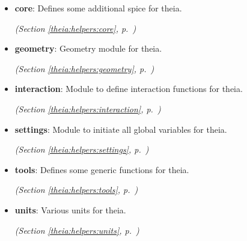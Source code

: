 \begin{itemize}
\setlength{\parskip}{0ex}
\item \textbf{core}: Defines some additional spice for theia.



  \textit{(Section \ref{theia:helpers:core}, p.~\pageref{theia:helpers:core})}

\item \textbf{geometry}: Geometry module for theia.



  \textit{(Section \ref{theia:helpers:geometry}, p.~\pageref{theia:helpers:geometry})}

\item \textbf{interaction}: Module to define interaction functions for theia.



  \textit{(Section \ref{theia:helpers:interaction}, p.~\pageref{theia:helpers:interaction})}

\item \textbf{settings}: Module to initiate all global variables for theia.



  \textit{(Section \ref{theia:helpers:settings}, p.~\pageref{theia:helpers:settings})}

\item \textbf{tools}: Defines some generic functions for theia.



  \textit{(Section \ref{theia:helpers:tools}, p.~\pageref{theia:helpers:tools})}

\item \textbf{units}: Various units for theia.



  \textit{(Section \ref{theia:helpers:units}, p.~\pageref{theia:helpers:units})}

\end{itemize}

